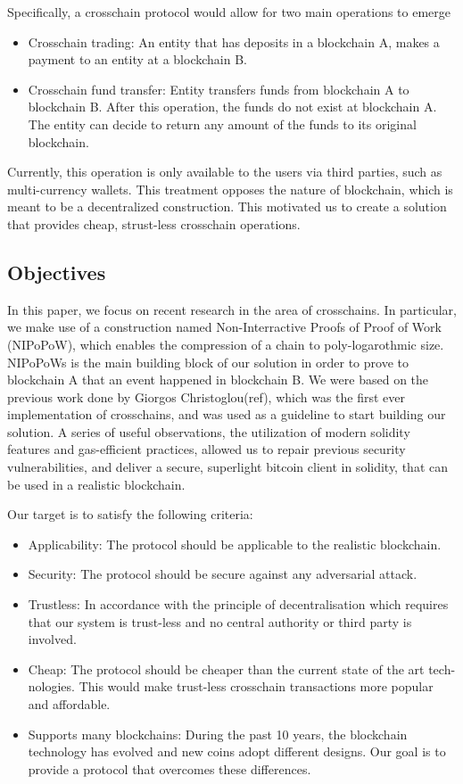 \documentclass{article}
\begin{document}
  Specifically, a crosschain protocol would allow for two main
  operations to emerge
  \begin{itemize}
  \item
    Crosschain trading: An entity that has deposits in a blockchain A,
    makes a payment to an entity at a blockchain B.
  \item
    Crosschain fund transfer: Entity transfers funds from blockchain A
    to blockchain B. After this operation, the funds do not exist at
    blockchain A. The entity can decide to return any amount of the
    funds to its original blockchain.
  \end{itemize}

  Currently, this operation is only available to the users via third
  parties, such as multi-currency wallets. This treatment opposes the
  nature of blockchain, which is meant to be a decentralized
  construction. This motivated us to create a solution that provides
  cheap, strust-less crosschain operations.

  \subsection{Objectives}

  In this paper, we focus on recent research in the area of crosschains.
  In particular, we make use of a construction named Non-Interractive
  Proofs of Proof of Work (NIPoPoW), which enables the compression of a
  chain to poly-logarothmic size. NIPoPoWs is the main building block of
  our solution in order to prove to blockchain A that an event happened
  in blockchain B. We were based on the previous work done by Giorgos
  Christoglou(ref), which was the first ever implementation of
  crosschains, and was used as a guideline to start building our
  solution. A series of useful observations, the utilization of modern
  solidity features and gas-efficient practices, allowed us to repair
  previous security vulnerabilities, and deliver a secure, superlight
  bitcoin client in solidity, that can be used in a realistic
  blockchain.

  Our target is to satisfy the following criteria:
  \begin{itemize}
  \item
    Applicability: The protocol should be applicable to the realistic
    blockchain.
  \item
    Security: The protocol should be secure against any adversarial
    attack.
  \item
    Trustless: In accordance with the principle of decentralisation
    which requires that our system is trust-less and no central
    authority or third party is involved.
  \item
    Cheap: The protocol should be cheaper than the current state of the
    art tech-nologies. This would make trust-less crosschain
    transactions more popular and affordable.
  \item
    Supports many blockchains: During the past 10 years, the blockchain
    technology has evolved and new coins adopt different designs. Our
    goal is to provide a protocol that overcomes these differences.
  \end{itemize}
\end{document}
